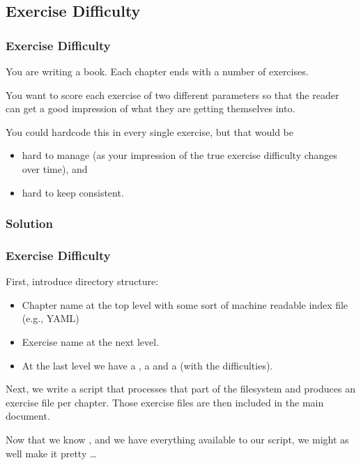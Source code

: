 {\subsection{Exercise Difficulty}
\begin{frame}[fragile]
  \frametitle{Exercise Difficulty}
  \pause
  \vspace{3mm}
  You are writing a book. Each chapter ends with a number of exercises.
  
  \vspace{5mm}
  You want to score each exercise of two different parameters so that the reader can get a good impression of what they are getting themselves into.
  
  \pause
  \vspace{5mm}
  You could hardcode this in every single exercise, but that would be
  \begin{itemize}
    \item hard to manage (as your impression of the true exercise difficulty changes over time), and
    \item hard to keep consistent.
  \end{itemize}
\end{frame}

\subsubsection{Solution}
\begin{frame}[fragile]
  \frametitle{Exercise Difficulty }
  \pause
  \vspace{3mm}
  First, introduce directory structure:
  \begin{itemize}
    \item Chapter name at the top level with some sort of machine readable index file (e.g., YAML)
    \item Exercise name at the next level.
    \item At the last level we have a , a  and a  (with the difficulties).
  \end{itemize}
  
  \pause
  \vspace{5mm}
  Next, we write a script that processes that part of the filesystem and produces an exercise file per chapter. Those exercise files are then included in the main document.
  
  \vspace{5mm}
  Now that we know \TikZ, and we have everything available to our script, we might as well make it pretty \ldots
\end{frame}

}
